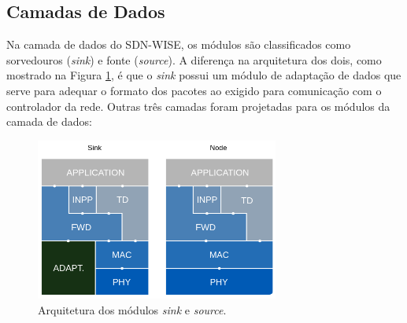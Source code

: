 \subsection{Camadas de Dados}

Na camada de dados do \ac{SDN-WISE}, os módulos são classificados como sorvedouros (\textit{sink}) e fonte (\textit{source}). A diferença na arquitetura dos dois, como mostrado na Figura \ref{Arq_camada_de_dados}, é que o \textit{sink} possui um módulo de adaptação de dados que serve para adequar o formato dos pacotes ao exigido para comunicação com o controlador da rede. Outras três camadas foram projetadas para os módulos da camada de dados:

\begin{figure}[!htb]
    \centering
    \includegraphics[width=8cm]{figs/arq_camada_de_dados.png}
    \caption{Arquitetura dos módulos \textit{sink} e \textit{source}. \cite{sdnwiseWebSite}}
    \label{Arq_camada_de_dados}
\end{figure}

